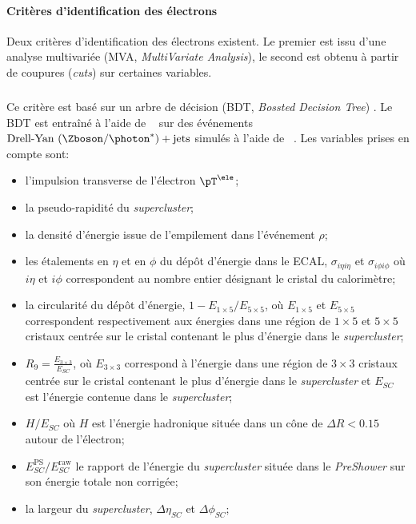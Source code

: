 \paragraph{Critères d'identification des électrons}
Deux critères d'identification des électrons existent.
Le premier est issu d'une analyse multivariée (MVA, \emph{MultiVariate Analysis}), le second est obtenu à partir de coupures (\emph{cuts}) sur certaines variables.
\subparagraph{\ELEIDMVA}
Ce critère est basé sur un arbre de décision (BDT, \emph{Bossted Decision Tree}) \cite{cmsElectronMVA}.
Le BDT est entraîné à l'aide de \XGBOOST~\cite{xgboost} sur des événements $\text{Drell-Yan ($\Zboson/\photon^*$)} + \text{jets}$ simulés à l'aide de \MADGRAPH~\cite{madgraph5}.
Les variables prises en compte sont:
\begin{itemize}
\item l'impulsion transverse de l'électron $\pT^{\ele}$;
\item la pseudo-rapidité du \emph{supercluster};
\item la densité d'énergie issue de l'empilement dans l'événement $\rho$;

\item les étalements en $\eta$ et en $\phi$ du dépôt d'énergie dans le ECAL, $\sigma_{i\eta i\eta}$ et $\sigma_{i\phi i\phi}$ où $i\eta$ et $i\phi$ correspondent au nombre entier désignant le cristal du calorimètre;
\item la circularité du dépôt d'énergie, $1- E_{1\times5}/E_{5\times5}$, où $ E_{1\times5}$ et $E_{5\times5}$ correspondent respectivement aux énergies dans une région de $1\times5$ et $5\times5$ cristaux centrée sur le cristal contenant le plus d'énergie dans le \emph{supercluster};
\item $R_9 = \frac{E_{3\times3}}{E_{SC}}$, où $ E_{3\times3}$ correspond à l'énergie dans une région de $3\times3$ cristaux centrée sur le cristal contenant le plus d'énergie dans le \emph{supercluster} et $E_{SC}$ est l'énergie contenue dans le \emph{supercluster};
\item $H/E_{SC}$ où $H$ est l'énergie hadronique située dans un cône de $\Delta R < \num{0.15}$ autour de l'électron;
\item $E_{SC}^\text{PS}/E_{SC}^\text{raw}$ le rapport de l'énergie du \emph{supercluster} située dans le \emph{PreShower} sur son énergie totale non corrigée;
\item la largeur du \emph{supercluster}, $\Delta \eta_{SC}$ et $\Delta \phi_{SC}$;


\end{itemize}
